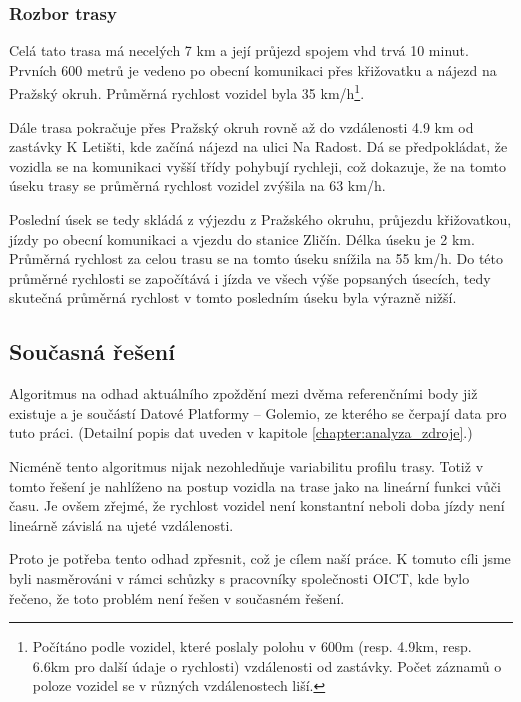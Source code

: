 \subsubsection{Rozbor trasy}

Celá tato trasa má necelých 7 km a její průjezd spojem \gls{vhd} trvá 10 minut. Prvních 600 metrů je vedeno po obecní komunikaci přes křižovatku a nájezd na Pražský okruh. Průměrná rychlost vozidel byla 35 km/h\footnote{Počítáno podle vozidel, které poslaly polohu v 600m (resp. 4.9km, resp. 6.6km pro další údaje o rychlosti) vzdálenosti od zastávky. Počet záznamů o poloze vozidel se v různých vzdálenostech liší.}.

\bigbreak

Dále trasa pokračuje přes Pražský okruh rovně až do vzdálenosti 4.9 km od zastávky K Letišti, kde začíná nájezd na ulici Na Radost. Dá se předpokládat, že vozidla se na komunikaci vyšší třídy pohybují rychleji, což dokazuje, že na tomto úseku trasy se průměrná rychlost vozidel zvýšila na 63 km/h.

\bigbreak

Poslední úsek se tedy skládá z výjezdu z Pražského okruhu, průjezdu křižovatkou, jízdy po obecní komunikaci a vjezdu do stanice Zličín. Délka úseku je 2 km. Průměrná rychlost za celou trasu se na tomto úseku snížila na 55 km/h. Do této průměrné rychlosti se započítává i jízda ve všech výše popsaných úsecích, tedy skutečná průměrná rychlost v tomto posledním úseku byla výrazně nižší.


\subsection{Současná řešení} \label{subsection:soucasna_reseni_odhadu}

Algoritmus na odhad aktuálního zpoždění mezi dvěma referenčními body již existuje a je součástí Datové Platformy -- Golemio, ze kterého se čerpají data pro tuto práci. (Detailní popis dat uveden v kapitole \ref{chapter:analyza_zdroje}.)

\bigbreak

Nicméně tento algoritmus nijak nezohledňuje variabilitu profilu trasy. Totiž v tomto řešení je nahlíženo na postup vozidla na trase jako na lineární funkci vůči času. Je ovšem zřejmé, že rychlost vozidel není konstantní neboli doba jízdy není lineárně závislá na ujeté vzdálenosti.

\bigbreak

Proto je potřeba tento odhad zpřesnit, což je cílem naší práce. K tomuto cíli jsme byli nasměrováni v rámci schůzky s pracovníky společnosti OICT, kde bylo řečeno, že toto problém není řešen v současném řešení.

